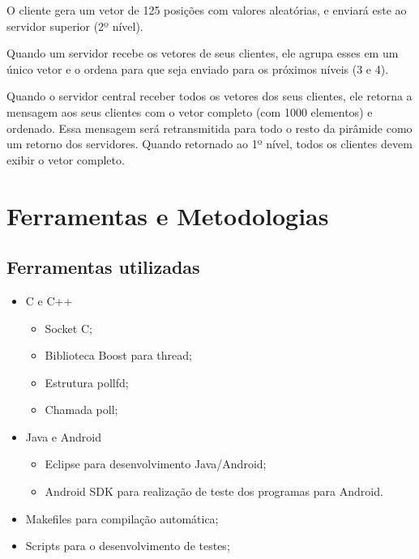\documentclass[11pt,twoside]{article}
\begin{document}
	O cliente gera um vetor de 125 posições com valores aleatórias, e enviará este ao servidor superior (2º nível).

	Quando um servidor recebe os vetores de seus clientes, ele agrupa esses em um único vetor e o ordena para que seja enviado para os próximos níveis (3 e 4).

	Quando o servidor central receber todos os vetores dos seus clientes, ele retorna a mensagem aos seus clientes com o vetor completo (com 1000 elementos) e ordenado. Essa mensagem será retransmitida para todo o resto da pirâmide como um retorno dos servidores. Quando retornado ao 1º nível, todos os clientes devem exibir o vetor completo.

\newpage
\section{Ferramentas e Metodologias}
\subsection{Ferramentas utilizadas}
\begin{itemize}
\item C e C++
	\begin{itemize}
	\item Socket C;
	\item Biblioteca Boost para thread;
	\item Estrutura pollfd;
	\item Chamada poll;
	\end{itemize}
\item Java e Android        
	\begin{itemize}
	\item Eclipse para desenvolvimento Java/Android;
	\item Android SDK para realização de teste dos programas para Android. 
	\end{itemize}
\item Makefiles para compilação automática;
\item Scripts para o desenvolvimento de testes;
\end{itemize}
\end{document}
